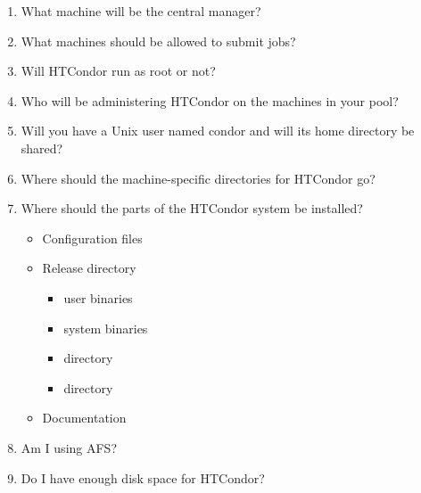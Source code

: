 \begin{enumerate}
\item What machine will be the central manager?
\item What machines should be allowed to submit jobs?
\item Will HTCondor run as root or not?
\item Who will be administering HTCondor on the machines in your pool?
\item Will you have a Unix user named condor and will its home directory be
   shared? 
\item Where should the machine-specific directories for HTCondor go?
\item Where should the parts of the HTCondor system be installed? 
	\begin{itemize}
	\item Configuration files
	\item Release directory
		\begin{itemize}
		\item user binaries
		\item system binaries 
		\item {} directory
	  	\item {} directory
		\end{itemize}
	\item Documentation
	\end{itemize}
\item Am I using AFS?
\item Do I have enough disk space for HTCondor?
\end{enumerate}

